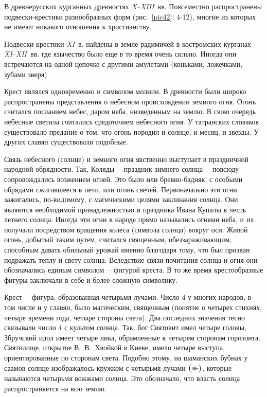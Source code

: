 \documentclass[pscyr,chapters]{hedwork}
\begin{document}
  В древнерусских курганных древностях \emph{X}--\emph{XIII}~вв. Повсеместно
  распространены подвески-крестики разнообразных форм (рис.~\ref{pic42}: 4-12),
  многие из которых не имеют никакого отношения к христианству.

  Подвески-крестики \emph{XI}~в. найдены в земле радимичей в костромских
  курганах \emph{XI}--\emph{XII}~вв. где язычество было еще в то время очень
  сильно. Иногда они встречаются на одной цепочке с другими амулетами (коньками,
  ложечками, зубами зверя).

  Крест являлся одновременно и символом молнии. В древности были широко
  распространены представления о небесном происхождении земного огня. Огонь
  считался посланием небес, даром неба, низведенным на землю. В свою очередь
  небесные светила считались средоточием небесного огня. У татранских словаков
  существовало предание о том, что огонь породил и солнце, и месяц, и звезды. У
  других славян существовали подобные.

  Связь небесного (солнце) и земного огня явственно выступает в праздничной
  народной обрядности. Так, Коляды~-- праздник зимнего солнца~-- повсюду
  сопровождались возжением огней. Это было или бревно-бадняк, с особыми обрядами
  сжигавшееся в печи, или огонь свечей. Первоначально эти огни зажигались,
  по-видимому, с магическими целями заклинания солнца. Они являются необходимой
  принадлежностью и праздника Ивана Купалы в честь летнего солнца. Иногда эти
  огни в народе прямо назывались огнями неба, и их получали посредством вращения
  колеса (символа солнца) вокруг оси. Живой огонь, добытый таким путем, считался
  священным, обеззараживающим, способным давать обильный урожай именно благодаря
  тому, что был призван подражать теплу и свету солнца. Вследствие связи
  почитания солнца и огня они обозначались единым символом~-- фигурой креста. В
  то же время крестообразные фигуры заключали в себе и более сложную символику.

  Крест~-- фигура, образованная четырьмя лучами. Число 4 у многих народов, в том
  числе и у славян, было магическим, священным (понятие о четырех стихиях,
  четыре времени года, четыре стороны света). Два последних значения тесно
  связывали число 4 с культом солнца. Так, бог Святовит имел четыре головы,
  Збручский идол имеет четыре лика, обрамленные к четырем сторонам горизонта.
  Святилище, открытое В.~В.~Хвойкой в Киеве, имело четыре выступа,
  ориентированные по сторонам света. Подобно этому, на шаманских бубнах у саамов
  солнце изображалось кружком с четырьмя лучами
  \( \big(+\hspace{-11.6pt}\circ \hspace{4pt}\big) \), 
  которые называются четырьмя вожжами солнца. Это обозначало, что власть солнца
  распространяется на всю землю.
\end{document}
